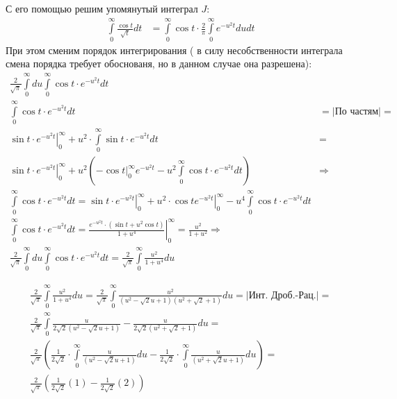 \documentclass{article}
\begin{document}
С его помощью решим упомянутый интеграл $J$:
\begin{equation*}
\begin{aligned}
\int\limits_0^{\infty} \frac{\cos{t}}{\sqrt{t}} dt &= \int\limits_0^{\infty} \cos{t} \cdot \frac{2}{\pi} \int\limits_0^{\infty} e^{-u^2 t}du dt
\end{aligned}
\end{equation*}
При этом сменим порядок интегрирования ( в силу несобственности интеграла смена порядка требует обоснованя, но в данном случае она разрешена):
\begin{equation*}
\begin{aligned}
\frac{2}{\sqrt{\pi}} \int\limits_0^{\infty} du  \int\limits_0^{\infty} \cos{t} \cdot  e^{-u^2 t} dt \\
\int\limits_0^{\infty} \cos{t} \cdot  e^{-u^2 t} dt &= |\text{По частям}| =\\
\left. \sin{t} \cdot e^{-u^2 t} \right|_0^{\infty} + u^2 \cdot \int\limits_0^{\infty} \sin{t} \cdot  e^{-u^2 t} dt &=\\
 \left.\sin{t} \cdot e^{-u^2 t} \right|_0^{\infty} + u^2 \left( \left. -\cos{t} \right|_0^{\infty} e^{-u^2 t} - u^2\int\limits_0^{\infty} \cos{t} \cdot  e^{-u^2 t} dt \right) & \Rightarrow\\
\int\limits_0^{\infty} \cos{t} \cdot  e^{-u^2 t} dt = \left. \sin{t} \cdot e^{-u^2 t} \right|_0^{\infty} + \left. u^2 \cdot \cos{t} e^{-u^2 t} \right|_0^{\infty} - u^4 \int\limits_0^{\infty} \cos{t}\cdot  e^{-u^2 t} dt \\
\int\limits_0^{\infty} \cos{t}\cdot  e^{-u^2 t} dt =\left. \frac{e^{-u^2 t}\cdot \left(\sin{t} + u^2 \cos{t} \right)}{1 + u^4} \right|_0^{\infty} = \frac{u^2}{1+u^2} \Rightarrow \\
\frac{2}{\sqrt{\pi}} \int\limits_0^{\infty} du  \int\limits_0^{\infty} \cos{t}\cdot  e^{-u^2 t} dt = \frac{2}{\sqrt{\pi}} \int\limits_0^{\infty} \frac{u^2}{1+u^4} du 
\end{aligned}
\end{equation*}

\begin{equation*}
\begin{aligned}
\frac{2}{\sqrt{\pi}} \int\limits_0^{\infty} \frac{u^2}{1+u^4} du = \frac{2}{\sqrt{\pi}} \int\limits_0^{\infty} \frac{u^2}{ (u^2-\sqrt{2}u+1) (u^2+\sqrt{2}+1) } du = |\text{Инт. Дроб.-Рац.}| =\\
\frac{2}{\sqrt{\pi}} \int\limits_0^{\infty} \frac{u}{ 2\sqrt{2}(u^2-\sqrt{2}u+1)} - \frac{u}{2\sqrt{2}(u^2+\sqrt{2}+1) } du =\\
\frac{2}{\sqrt{\pi}} \left( \frac{1}{2\sqrt{2}}\cdot \int\limits_0^{\infty} \frac{u}{(u^2-\sqrt{2}u+1)} du - \frac{1}{2\sqrt{2}}\cdot \int\limits_0^{\infty} \frac{u}{(u^2+\sqrt{2}u+1)} du \right) =\\
\frac{2}{\sqrt{\pi}} \left( \frac{1}{2\sqrt{2}} (1) - \frac{1}{2\sqrt{2}} (2) \right)
\end{aligned}
\end{equation*}
\end{document}
